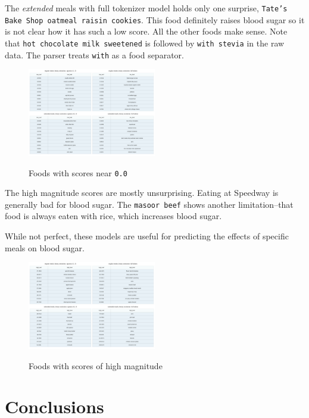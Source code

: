 \documentclass[conference]{IEEEtran}
\begin{document}
The \emph{extended} meals with full tokenizer model holds only one surprise, \texttt{Tate's Bake Shop oatmeal raisin cookies}. This food definitely raises blood sugar so it is not clear how it has such a low score. All the other foods make sense. Note that \texttt{hot chocolate milk sweetened} is followed by \texttt{with stevia} in the raw data. The parser treats \texttt{with} as a food separator.

\begin{figure}[tbp]
    \includegraphics[width=0.5\textwidth]{images/low_gplus_best_models.png}
    \label{fig:low_best}
    \caption{Foods with scores near \texttt{0.0}}
\end{figure}

The high magnitude scores are mostly unsurprising. Eating at Speedway is generally bad for blood sugar. The \texttt{masoor beef} shows another limitation--that food is always eaten with rice, which increases blood sugar.

While not perfect, these models are useful for predicting the effects of specific meals on blood sugar.

\begin{figure}[tbp]
    \includegraphics[width=0.5\textwidth]{images/high_gplus_best_models.png}
    \label{fig:high_best}
    \caption{Foods with scores of high magnitude}
\end{figure}

\section{Conclusions}
\end{document}
